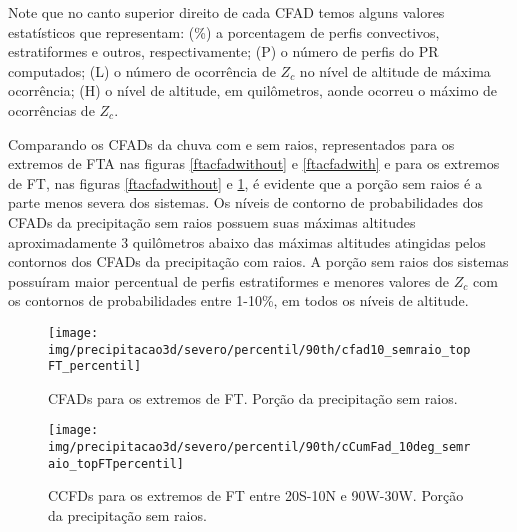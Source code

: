 Note que no canto superior direito de cada CFAD temos alguns valores estatísticos que representam: (\%)  a porcentagem de perfis convectivos, estratiformes e outros, respectivamente; (P)  o número de perfis do PR computados; (L)  o número de ocorrência de $Z_c$ no nível de altitude de máxima ocorrência; (H)  o nível de altitude, em quilômetros, aonde ocorreu o máximo de ocorrências de $Z_c$.

Comparando os CFADs da chuva com e sem raios, representados para os extremos de FTA nas figuras \ref{ftacfadwithout} e \ref{ftacfadwith} e para os extremos de FT, nas figuras \ref{ftacfadwithout} e \ref{ftcfadwithout}, é evidente que a porção sem raios é a parte menos severa dos sistemas. Os níveis de contorno de probabilidades dos CFADs da precipitação sem raios possuem suas máximas altitudes aproximadamente 3 quilômetros abaixo das máximas altitudes atingidas pelos contornos dos CFADs da precipitação com raios. A porção sem raios dos sistemas possuíram maior percentual de perfis estratiformes e menores valores de $Z_c$ com os contornos de probabilidades entre 1-10\%, em todos os níveis de altitude.



\begin{figure}[!ht]
  \centering
  \texttt{[image: img/precipitacao3d/severo/percentil/90th/cfad10\_semraio\_topFT\_percentil]}
 \caption{CFADs para os extremos de FT. Porção da precipitação sem raios.}
 \label{ftcfadwithout}
\end{figure} 

\begin{figure}[!ht]
  \centering
   {\texttt{[image: img/precipitacao3d/severo/percentil/90th/cCumFad\_10deg\_semraio\_topFTpercentil]}}
 \caption{CCFDs para os extremos de FT entre 20S-10N e 90W-30W. Porção da precipitação sem raios.}
 \label{ftccfadwithout}
\end{figure} 

